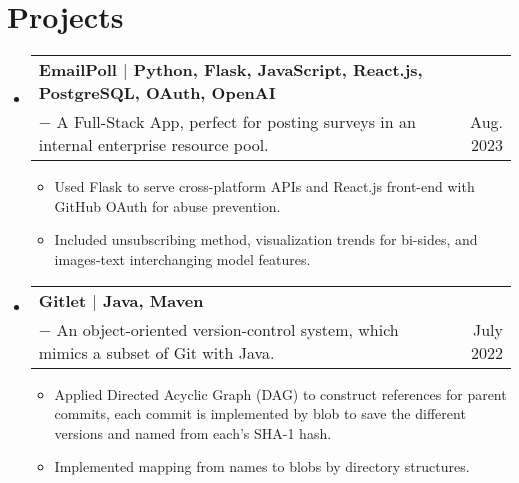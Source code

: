 \documentclass[letterpaper,10pt]{article}
\makeatletter
\newcommand{\skill}[1]{\small{\textnormal{$|$ {#1}}}}
\newcommand{\resumeItem}[1]{
  \item\small{
    {#1 \vspace{-2pt}}
  }
}
\newcommand{\resumeProjectHeading}[3]{
    \item
    \begin{tabular*}{0.97\textwidth}{l@{\extracolsep{\fill}}r}
      \textbf{#1} \\
      \small#2 & \small #3 \\
    \end{tabular*}\vspace{-7pt}
}
\newcommand{\resumeSubHeadingListStart}{\begin{itemize}[leftmargin=0.15in, label={}]}
\newcommand{\resumeSubHeadingListEnd}{\end{itemize}}
\newcommand{\resumeItemListStart}{\begin{itemize}}
\newcommand{\resumeItemListEnd}{\end{itemize}\vspace{-5pt}}
\makeatother
\begin{document}
\section{Projects}
\resumeSubHeadingListStart

\resumeProjectHeading
{\textbf{EmailPoll} \skill{Python, Flask, JavaScript, React.js, PostgreSQL, OAuth, OpenAI}}
{$-$ A Full-Stack App, perfect for posting surveys in an internal enterprise resource pool.}
{Aug. 2023}
\resumeItemListStart
\resumeItem{Used Flask to serve cross-platform APIs and React.js front-end with GitHub OAuth for abuse prevention.}
\resumeItem{Included unsubscribing method, visualization trends for bi-sides, and images-text interchanging model features.}
\resumeItemListEnd

\resumeProjectHeading
{\textbf{Gitlet} \skill{Java, Maven}}
{$-$ An object-oriented version-control system, which mimics a subset of Git with Java.}
{July 2022}
\resumeItemListStart
\resumeItem{Applied Directed Acyclic Graph (DAG) to construct references for parent commits, each commit is implemented by blob to save the different versions and named from each's SHA-1 hash.}
\resumeItem{Implemented mapping from names to blobs by directory structures.}
\resumeItemListEnd
\resumeSubHeadingListEnd


%

\end{document}
